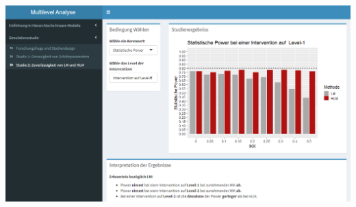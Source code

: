 \documentclass[12pt, a4paper]{article}\usepackage[]{graphicx}\usepackage[]{color}
\begin{document}
\begin{center}
\includegraphics[scale=0.5]{./figures/app_study2}
\end{center}
\end{document}
